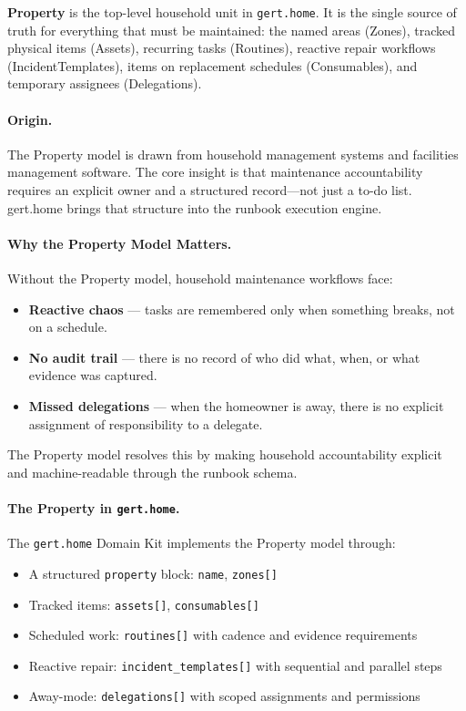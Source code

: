 \textbf{Property} is the top-level household unit in \texttt{gert.home}. It is the single
source of truth for everything that must be maintained: the named areas (Zones), tracked
physical items (Assets), recurring tasks (Routines), reactive repair workflows
(IncidentTemplates), items on replacement schedules (Consumables), and temporary assignees
(Delegations).

\paragraph{Origin.}
The Property model is drawn from household management systems and facilities management
software. The core insight is that maintenance accountability requires an explicit owner and a
structured record---not just a to-do list. gert.home brings that structure into the runbook
execution engine.

\paragraph{Why the Property Model Matters.}
Without the Property model, household maintenance workflows face:
\begin{itemize}
  \item \textbf{Reactive chaos} --- tasks are remembered only when something breaks, not on
        a schedule.
  \item \textbf{No audit trail} --- there is no record of who did what, when, or what
        evidence was captured.
  \item \textbf{Missed delegations} --- when the homeowner is away, there is no explicit
        assignment of responsibility to a delegate.
\end{itemize}

The Property model resolves this by making household accountability explicit and
machine-readable through the runbook schema.

\paragraph{The Property in \texttt{gert.home}.}
The \texttt{gert.home} Domain Kit implements the Property model through:
\begin{itemize}
  \item A structured \texttt{property} block: \texttt{name}, \texttt{zones[]}
  \item Tracked items: \texttt{assets[]}, \texttt{consumables[]}
  \item Scheduled work: \texttt{routines[]} with cadence and evidence requirements
  \item Reactive repair: \texttt{incident\_templates[]} with sequential and parallel steps
  \item Away-mode: \texttt{delegations[]} with scoped assignments and permissions
\end{itemize}

